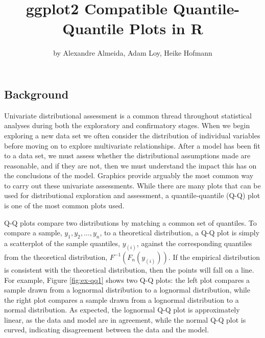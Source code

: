 \title{ggplot2 Compatible Quantile-Quantile Plots in R}
\author{by Alexandre Almeida, Adam Loy, Heike Hofmann}

\maketitle


\newcommand{\hh}[1]{{\textcolor{orange}{#1}}}
\newcommand{\al}[1]{{\textcolor{violet}{#1}}}
\newcommand{\Aa}[1]{{\textcolor{olive}{#1}}}

\subsection{Background}\label{background}

\label{sec:background}

Univariate distributional assessment is a common thread throughout
statistical analyses during both the exploratory and confirmatory
stages. When we begin exploring a new data set we often consider the
distribution of individual variables before moving on to explore
multivariate relationships. After a model has been fit to a data set, we
must assess whether the distributional assumptions made are reasonable,
and if they are not, then we must understand the impact this has on the
conclusions of the model. Graphics provide arguably the most common way
to carry out these univariate assessments. While there are many plots
that can be used for distributional exploration and assessment, a
quantile-quantile (Q-Q) plot \citep{Wilk1968-ii} is one of the most
common plots used.

Q-Q plots compare two distributions by matching a common set of
quantiles. To compare a sample, \(y_1, y_2, \ldots, y_n\), to a
theoretical distribution, a Q-Q plot is simply a scatterplot of the
sample quantiles, \(y_{(i)}\), against the corresponding quantiles from
the theoretical distribution, \(F^{-1}\left( F_n(y_{(i)}) \right)\). If
the empirical distribution is consistent with the theoretical
distribution, then the points will fall on a line. For example, Figure
\ref{fig:ex-qq1} shows two Q-Q plots: the left plot compares a sample
drawn from a lognormal distribution to a lognormal distribution, while
the right plot compares a sample drawn from a lognormal distribution to
a normal distribution. As expected, the lognormal Q-Q plot is
approximately linear, as the data and model are in agreement, while the
normal Q-Q plot is curved, indicating disagreement between the data and
the model.

